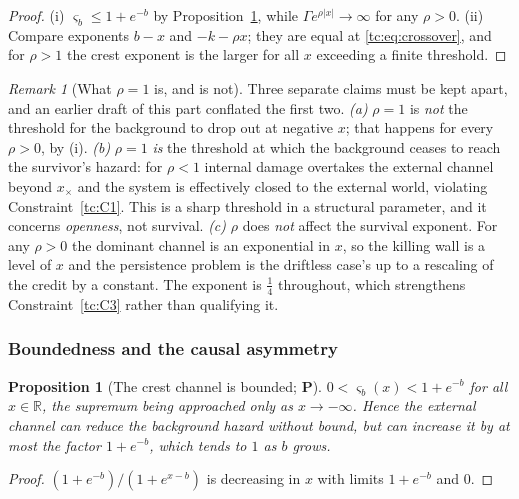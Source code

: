 \documentclass[11pt]{article}
\numberwithin{equation}{section}
\theoremstyle{plain}
\newtheorem{proposition}[theorem]{Proposition}
\theoremstyle{definition}
\theoremstyle{remark}
\newtheorem{remark}[theorem]{Remark}
\newcommand{\R}{\mathbb{R}}
\begin{document}
\begin{proof}
(i) $\varsigma_b\le1+e^{-b}$ by Proposition~\ref{tc:prop:bounded}, while
$\Gamma e^{\rho|x|}\to\infty$ for any $\rho>0$. (ii) Compare exponents
$b-x$ and $-k-\rho x$; they are equal at \eqref{tc:eq:crossover}, and
for $\rho>1$ the crest exponent is the larger for all $x$ exceeding a
finite threshold.
\end{proof}

\begin{remark}[What $\rho=1$ is, and is not]\label{tc:rem:rhorole}
Three separate claims must be kept apart, and an earlier draft of this part conflated the first two.
\emph{(a)} $\rho=1$ is \emph{not} the threshold for the background to
drop out at negative $x$; that happens for every $\rho>0$, by
(i).
\emph{(b)} $\rho=1$ \emph{is} the threshold at which the background
ceases to reach the survivor's hazard: for $\rho<1$ internal damage
overtakes the external channel beyond $x_{\times}$ and the system is
effectively closed to the external world, violating
Constraint~\ref{tc:C1}. This is a sharp threshold in a structural
parameter, and it concerns \emph{openness}, not survival.
\emph{(c)} $\rho$ does \emph{not} affect the survival exponent. For any
$\rho>0$ the dominant channel is an exponential in $x$, so the killing
wall is a level of $x$ and the persistence problem is the driftless case's up
to a rescaling of the credit by a constant. The exponent is $\tfrac14$
throughout, which strengthens Constraint~\ref{tc:C3} rather than
qualifying it.
\end{remark}

\subsubsection{Boundedness and the causal asymmetry}
\label{tc:subsub:asymmetry}

\begin{proposition}[The crest channel is bounded; \textbf{P}]
\label{tc:prop:bounded}
$0<\varsigma_b(x)<1+e^{-b}$ for all $x\in\R$, the supremum being
approached only as $x\to-\infty$. Hence the external channel can
\emph{reduce} the background hazard without bound, but can
\emph{increase} it by at most the factor $1+e^{-b}$, which tends to $1$
as $b$ grows.
\end{proposition}

\begin{proof}
$(1+e^{-b})/(1+e^{x-b})$ is decreasing in $x$ with limits $1+e^{-b}$ and
$0$.
\end{proof}
\end{document}
